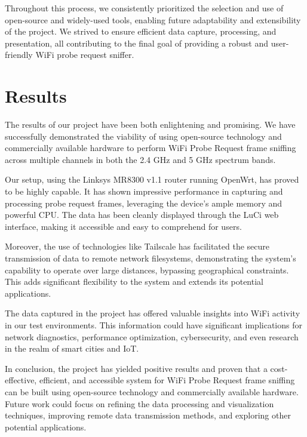 \documentclass{article}
\begin{document}
Throughout this process, we consistently prioritized the selection and use of open-source and widely-used tools, enabling future adaptability and extensibility of the project. We strived to ensure efficient data capture, processing, and presentation, all contributing to the final goal of providing a robust and user-friendly WiFi probe request sniffer.


\section{Results}
 
The results of our project have been both enlightening and promising. We have successfully demonstrated the viability of using open-source technology and commercially available hardware to perform WiFi Probe Request frame sniffing across multiple channels in both the 2.4 GHz and 5 GHz spectrum bands.

Our setup, using the Linksys MR8300 v1.1 router running OpenWrt, has proved to be highly capable. It has shown impressive performance in capturing and processing probe request frames, leveraging the device's ample memory and powerful CPU. The data has been cleanly displayed through the LuCi web interface, making it accessible and easy to comprehend for users.

Moreover, the use of technologies like Tailscale has facilitated the secure transmission of data to remote network filesystems, demonstrating the system's capability to operate over large distances, bypassing geographical constraints. This adds significant flexibility to the system and extends its potential applications.

The data captured in the project has offered valuable insights into WiFi activity in our test environments. This information could have significant implications for network diagnostics, performance optimization, cybersecurity, and even research in the realm of smart cities and IoT.

In conclusion, the project has yielded positive results and proven that a cost-effective, efficient, and accessible system for WiFi Probe Request frame sniffing can be built using open-source technology and commercially available hardware. Future work could focus on refining the data processing and visualization techniques, improving remote data transmission methods, and exploring other potential applications.


\end{document}
